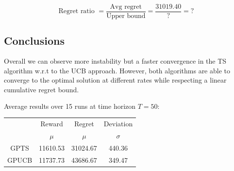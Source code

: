 \begin{displaymath}
	\text{Regret ratio } = \frac{\text{Avg regret}}{\text{Upper bound}} = \frac{31019.40}{?} = ?
\end{displaymath}


\subsection{Conclusions}

Overall we can observe more instability but a faster convergence in the TS algorithm w.r.t to the UCB approach.
However, both algorithms are able to converge to the optimal solution at different rates while respecting a linear cumulative regret bound.

Average results over 15 runs at time horizon $T = 50$:

\begin{table}[h]
	\center
	\begin{tabular}{|c|cc|c|}
	\hline \hline
		\cellcolor{blue!25} & Reward 	& Regret	& Deviation \\
	\cline{2-4}
		\cellcolor{blue!25} & $\mu$		& $\mu$		& $\sigma$	\\
	\hline \hline
		GPTS 				& 11610.53 	& 31024.67	& 440.36 	\\
	\hline
		GPUCB				& 11737.73	& 43686.67	& 349.47	\\
	\hline \hline
	\end{tabular}
\end{table}
